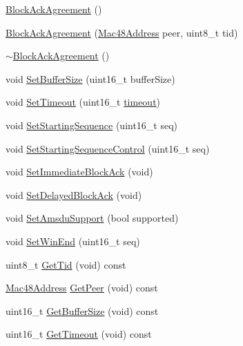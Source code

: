 \begin{DoxyCompactItemize}
\item 
\hyperlink{classns3_1_1BlockAckAgreement_a770a179186188b31e6003f9c751ee010}{Block\+Ack\+Agreement} ()
\item 
\hyperlink{classns3_1_1BlockAckAgreement_a0ec5b9863ef465a1bcaebbf8e5159e46}{Block\+Ack\+Agreement} (\hyperlink{classns3_1_1Mac48Address}{Mac48\+Address} peer, uint8\+\_\+t tid)
\item 
\hyperlink{classns3_1_1BlockAckAgreement_a38979a75573aae12cd732d1b7ac3b4ec}{$\sim$\+Block\+Ack\+Agreement} ()
\item 
void \hyperlink{classns3_1_1BlockAckAgreement_a78071664adb9207a45124d882b1860c8}{Set\+Buffer\+Size} (uint16\+\_\+t buffer\+Size)
\item 
void \hyperlink{classns3_1_1BlockAckAgreement_aad0a85e49e6e939a2d23094acf871c7b}{Set\+Timeout} (uint16\+\_\+t \hyperlink{openflow-switch_8cc_a386d174ae121d1cfa279074b7e209714}{timeout})
\item 
void \hyperlink{classns3_1_1BlockAckAgreement_a2845733071e12a0f049bb7a90e174d61}{Set\+Starting\+Sequence} (uint16\+\_\+t seq)
\item 
void \hyperlink{classns3_1_1BlockAckAgreement_a559d02750dca9495de6f05b935ecdba1}{Set\+Starting\+Sequence\+Control} (uint16\+\_\+t seq)
\item 
void \hyperlink{classns3_1_1BlockAckAgreement_a10cc1c1547def33759fd958ff5cfe8b2}{Set\+Immediate\+Block\+Ack} (void)
\item 
void \hyperlink{classns3_1_1BlockAckAgreement_a306b340b9e9f05cbd5fedd3a412aa6ca}{Set\+Delayed\+Block\+Ack} (void)
\item 
void \hyperlink{classns3_1_1BlockAckAgreement_a8597f6b15616bc0faac1e35966cda24f}{Set\+Amsdu\+Support} (bool supported)
\item 
void \hyperlink{classns3_1_1BlockAckAgreement_ae44c3dc69da08a3f2cff3a3eefd730d6}{Set\+Win\+End} (uint16\+\_\+t seq)
\item 
uint8\+\_\+t \hyperlink{classns3_1_1BlockAckAgreement_abde33346da920d38ea70bf7e83620315}{Get\+Tid} (void) const 
\item 
\hyperlink{classns3_1_1Mac48Address}{Mac48\+Address} \hyperlink{classns3_1_1BlockAckAgreement_a6ae0627c80f004fcb1a13ea49cb46e9c}{Get\+Peer} (void) const 
\item 
uint16\+\_\+t \hyperlink{classns3_1_1BlockAckAgreement_aea4f977c863556946e412f6d6e9bbc29}{Get\+Buffer\+Size} (void) const 
\item 
uint16\+\_\+t \hyperlink{classns3_1_1BlockAckAgreement_a657cea60759c182dd429d1257b2ef6a4}{Get\+Timeout} (void) const 

\end{DoxyCompactItemize}
